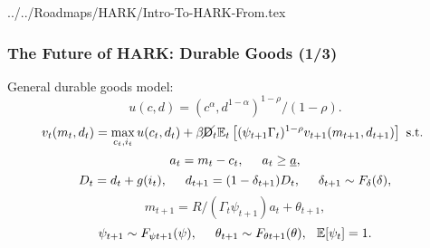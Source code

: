 \documentclass[11ptt]{beamer}
\newcommand{\bi}{\begin{itemize}}
\begin{document}
\begin{verbatimwrite}{../../Roadmaps/HARK/Intro-To-HARK-From.tex}

  \begin{frame}\label{DurableGoods}
    \frametitle{The Future of HARK: Durable Goods (1/3)}

    General durable goods model:
    \begin{equation*}
      u(c,d) = (c^\alpha,d^{1-\alpha})^{1-\rho}/(1-\rho).
    \end{equation*}
    \begin{equation*}
      v_t(m_t,d_t) = \max_{c_t,i_t} u(c_t,d_t) + \beta \cancel{\mathsf{D}}_t \mathbb{E}_t \left[(\psi_{t+1} \Gamma_t)^{1-\rho} v_{t+1}(m_{t+1},d_{t+1}) \right] \text{ s.t. }
    \end{equation*}
    \begin{equation*}
      a_t = m_t - c_t, \hspace{0.5cm} a_t \geq \underline{a},
    \end{equation*}
    \begin{equation*}
      D_t = d_t + g(i_t), \hspace{0.5cm} d_{t+1} = (1-\delta_{t+1})D_t, \hspace{0.5cm} \delta_{t+1} \sim F_{\delta}(\delta),
    \end{equation*}
    \begin{equation*}
      m_{t+1} = R/(\Gamma_t \psi_{t+1}) a_t + \theta_{t+1}, 
    \end{equation*}
    \begin{equation*}
      \psi_{t+1} \sim F_{\psi t+1}(\psi), \hspace{0.5cm} \theta_{t+1} \sim F_{\theta t+1}(\theta), \hspace{0.25cm} \mathbb{E}[\psi_t] = 1.
    \end{equation*}
  \end{frame}



\end{verbatimwrite}
\end{document}
